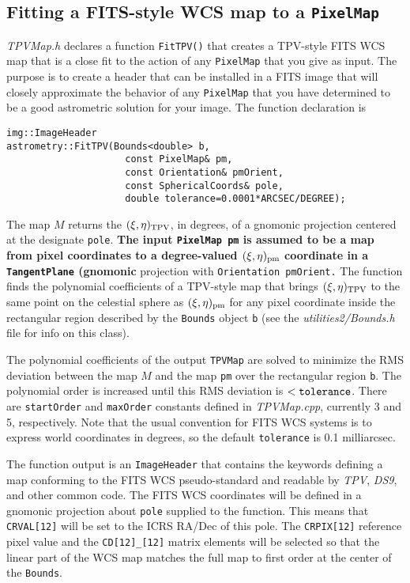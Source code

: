 \documentclass[11pt,preprint,flushrt]{aastex}
\begin{document}
\subsection{Fitting a FITS-style WCS map to a {\tt PixelMap}}
{\it TPVMap.h} declares a function {\tt FitTPV()} that creates a TPV-style FITS WCS map that is a close fit to the action of any {\tt PixelMap} that you give as input.  The purpose is to create a header that can be installed in a FITS image that will closely approximate the behavior of any {\tt PixelMap} that you have determined to be a good astrometric solution for your image.  The function declaration is
\begin{verbatim}
img::ImageHeader 
astrometry::FitTPV(Bounds<double> b,
                     const PixelMap& pm,
                     const Orientation& pmOrient,
                     const SphericalCoords& pole,
                     double tolerance=0.0001*ARCSEC/DEGREE);
\end{verbatim}
The map $M$ returns the $(\xi,\eta)_{\rm TPV}$, in degrees, of a gnomonic projection centered at the designate {\tt pole}.  {\bf The input {\tt PixelMap pm} is assumed to be a map from pixel coordinates to a degree-valued $(\xi,\eta)_{\rm pm}$ coordinate in a {\tt TangentPlane} (gnomonic} projection with {\tt Orientation pmOrient.}  The function finds the polynomial coefficients of a TPV-style map that brings $(\xi,\eta)_{\rm TPV}$ to the same point on the celestial sphere as $(\xi,\eta)_{\rm pm}$ for any pixel coordinate inside the rectangular region described by the {\tt Bounds} object {\tt b} (see the {\it utilities2/Bounds.h} file for info on this class).  

The polynomial coefficients of the output {\tt TPVMap} are solved to minimize the RMS deviation between the map $M$ and the map {\tt pm} over the rectangular region {\tt b}.   The polynomial order is increased until this RMS deviation is $<{\tt tolerance}$.  There are {\tt startOrder} and {\tt maxOrder} constants defined in {\it TPVMap.cpp}, currently 3 and 5, respectively.  Note that the usual convention for FITS WCS systems is to express world coordinates in degrees, so the default {\tt tolerance} is 0.1 milliarcsec.  

The function output is an {\tt ImageHeader} that contains the keywords defining a map conforming to the FITS WCS pseudo-standard and readable by {\it TPV}, {\it DS9}, and other common code.  
The FITS WCS coordinates will be defined in a gnomonic projection about {\tt pole} supplied to the function.  This means that {\tt CRVAL[12]} will be set to the ICRS RA/Dec of this pole.  The {\tt CRPIX[12]} reference pixel value and the {\tt CD[12]\_[12]} matrix elements will be selected so that the linear part of the WCS map matches the full map to first order at the center of the {\tt Bounds}.
\end{document}
